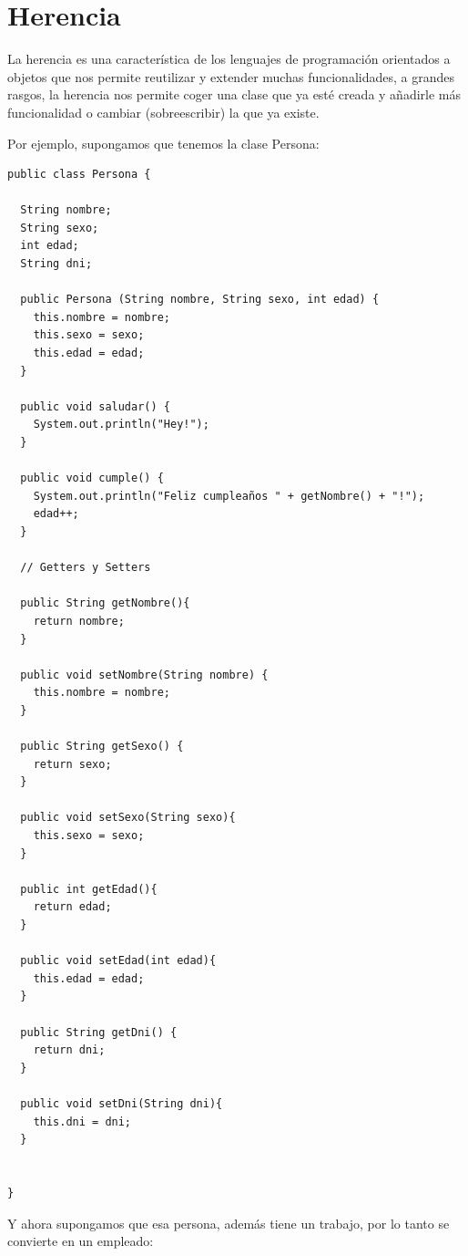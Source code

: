 \documentclass[11pt]{article}
\begin{document}
\section{Herencia}
\label{sec:org5503a60}
La herencia es una característica de los lenguajes de programación orientados a objetos que nos permite reutilizar y extender muchas funcionalidades, a grandes rasgos, la herencia nos permite coger una clase que ya esté creada y añadirle más funcionalidad o cambiar (sobreescribir) la que ya existe. 

Por ejemplo, supongamos que tenemos la clase Persona:

\begin{verbatim}
public class Persona {

  String nombre;
  String sexo;
  int edad;
  String dni;

  public Persona (String nombre, String sexo, int edad) {
    this.nombre = nombre;
    this.sexo = sexo;
    this.edad = edad;
  }

  public void saludar() {
    System.out.println("Hey!");
  }

  public void cumple() {
    System.out.println("Feliz cumpleaños " + getNombre() + "!");
    edad++;
  }

  // Getters y Setters

  public String getNombre(){
    return nombre;
  }

  public void setNombre(String nombre) {
    this.nombre = nombre;
  }

  public String getSexo() {
    return sexo;
  }

  public void setSexo(String sexo){
    this.sexo = sexo;
  }

  public int getEdad(){
    return edad;
  }

  public void setEdad(int edad){
    this.edad = edad;
  }

  public String getDni() {
    return dni;
  }

  public void setDni(String dni){
    this.dni = dni;
  }


}
\end{verbatim}

Y ahora supongamos que esa persona, además tiene un trabajo, por lo tanto se convierte en un empleado:
\end{document}
